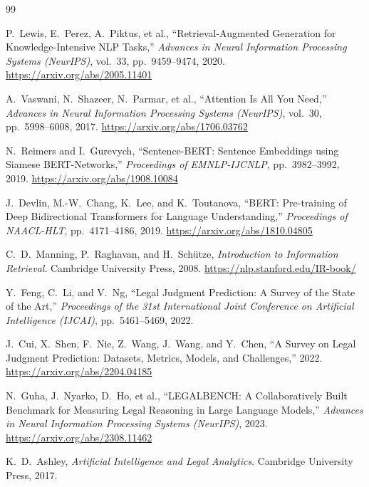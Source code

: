\documentclass[12pt,a4paper]{article}
\begin{document}
\newpage
\begin{thebibliography}{99}

P.~Lewis, E.~Perez, A.~Piktus, et al.,
``Retrieval-Augmented Generation for Knowledge-Intensive NLP Tasks,''
\textit{Advances in Neural Information Processing Systems (NeurIPS)},
vol.~33, pp.~9459--9474, 2020.
\url{https://arxiv.org/abs/2005.11401}

A.~Vaswani, N.~Shazeer, N.~Parmar, et al.,
``Attention Is All You Need,''
\textit{Advances in Neural Information Processing Systems (NeurIPS)},
vol.~30, pp.~5998--6008, 2017.
\url{https://arxiv.org/abs/1706.03762}

N.~Reimers and I.~Gurevych,
``Sentence-BERT: Sentence Embeddings using Siamese BERT-Networks,''
\textit{Proceedings of EMNLP-IJCNLP}, pp.~3982--3992, 2019.
\url{https://arxiv.org/abs/1908.10084}

J.~Devlin, M.-W.~Chang, K.~Lee, and K.~Toutanova,
``BERT: Pre-training of Deep Bidirectional Transformers for Language Understanding,''
\textit{Proceedings of NAACL-HLT}, pp.~4171--4186, 2019.
\url{https://arxiv.org/abs/1810.04805}

C.~D.~Manning, P.~Raghavan, and H.~Sch\"{u}tze,
\textit{Introduction to Information Retrieval}.
Cambridge University Press, 2008.
\url{https://nlp.stanford.edu/IR-book/}

Y.~Feng, C.~Li, and V.~Ng,
``Legal Judgment Prediction: A Survey of the State of the Art,''
\textit{Proceedings of the 31st International Joint Conference on Artificial
Intelligence (IJCAI)}, pp.~5461--5469, 2022.

J.~Cui, X.~Shen, F.~Nie, Z.~Wang, J.~Wang, and Y.~Chen,
``A Survey on Legal Judgment Prediction: Datasets, Metrics, Models, and Challenges,''
2022.
\url{https://arxiv.org/abs/2204.04185}

N.~Guha, J.~Nyarko, D.~Ho, et al.,
``LEGALBENCH: A Collaboratively Built Benchmark for Measuring Legal Reasoning in
Large Language Models,''
\textit{Advances in Neural Information Processing Systems (NeurIPS)}, 2023.
\url{https://arxiv.org/abs/2308.11462}

K.~D.~Ashley,
\textit{Artificial Intelligence and Legal Analytics}.
Cambridge University Press, 2017.


\end{thebibliography}
\end{document}
